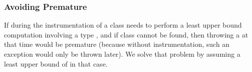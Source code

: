 \subsubsection*{Avoiding Premature }

If during the instrumentation of a class 
\jnif{} needs to perform a least upper bound computation involving a type ,
and if class  cannot be found,
then throwing a  at that time would be premature
(because without instrumentation,
such an exception would only be thrown later).
We solve that problem by assuming a least upper bound of  in that case.
